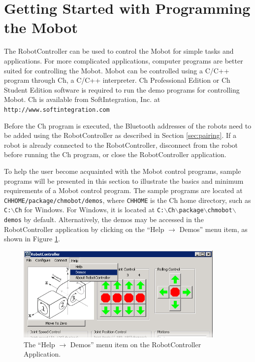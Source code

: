 \documentclass{article}
\begin{document}
\section{Getting Started with Programming the Mobot}
The RobotController can be used to control the Mobot for simple tasks and applications.
For more complicated applications, computer programs are better suited for controlling
the Mobot.
Mobot can be controlled using a C/C++ program through Ch, a C/C++ interpreter.
Ch Professional Edition or Ch Student Edition software is required to run the 
demo programs for controlling Mobot. Ch is available from SoftIntegration, Inc. at 
\texttt{http://www.softintegration.com}

Before the Ch program is executed, the Bluetooth addresses of the robots
need to be added using the RobotController as described in Section \ref{sec:pairing}.
If a robot is already connected to the RobotController, disconnect
from the robot before running the Ch program, or close the RobotController application.

To help the user become acquainted with the Mobot control programs, sample
programs will be presented in this section to illustrate the basics and minimum requirements of
a Mobot control program. The sample programs are located at 
\texttt{CHHOME/package/chmobot/demos}, where \texttt{CHHOME} is the 
Ch home directory, such as \texttt{C:$\backslash$Ch} for Windows. For Windows,
it is located at \texttt{C:$\backslash$Ch$\backslash$package$\backslash$chmobot$\backslash$demos} by default. 
Alternatively, the demos may be accessed in the RobotController application
by clicking on the ``Help $\rightarrow$ Demos'' menu item, as shown in Figure
\ref{fig:help_demos_screenshot}.

\begin{figure}
  \centering
  \includegraphics[width=4in]{images/help_demos_screenshot.png}
  \caption{The ``Help $\rightarrow$ Demos'' menu item on the RobotController Application.}
  \label{fig:help_demos_screenshot}
\end{figure}
\end{document}
